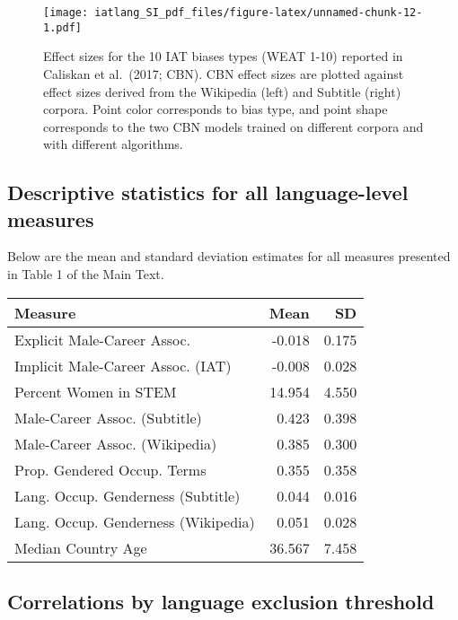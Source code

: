 \documentclass[]{article}
\begin{document}
\begin{figure}
\centering
\texttt{[image: iatlang\_SI\_pdf\_files/figure-latex/unnamed-chunk-12-1.pdf]}
\caption{Effect sizes for the 10 IAT biases types (WEAT 1-10) reported
in Caliskan et al.~(2017; CBN). CBN effect sizes are plotted against
effect sizes derived from the Wikipedia (left) and Subtitle (right)
corpora. Point color corresponds to bias type, and point shape
corresponds to the two CBN models trained on different corpora and with
different algorithms.}
\end{figure}

\hypertarget{descriptive-statistics-for-all-language-level-measures}{%
\subsection{Descriptive statistics for all language-level
measures}\label{descriptive-statistics-for-all-language-level-measures}}

Below are the mean and standard deviation estimates for all measures
presented in Table 1 of the Main Text.

\begin{table}[H]
\centering\begingroup\fontsize{9}{11}\selectfont

\begin{tabular}{l|r|r}
\hline
Measure & Mean & SD\\
\hline
Explicit Male-Career Assoc. & -0.018 & 0.175\\
\hline
Implicit Male-Career Assoc. (IAT) & -0.008 & 0.028\\
\hline
Percent Women in STEM & 14.954 & 4.550\\
\hline
Male-Career Assoc. (Subtitle) & 0.423 & 0.398\\
\hline
Male-Career Assoc. (Wikipedia) & 0.385 & 0.300\\
\hline
Prop. Gendered Occup. Terms & 0.355 & 0.358\\
\hline
Lang. Occup. Genderness (Subtitle) & 0.044 & 0.016\\
\hline
Lang. Occup. Genderness (Wikipedia) & 0.051 & 0.028\\
\hline
Median Country Age & 36.567 & 7.458\\
\hline
\end{tabular}
\endgroup{}
\end{table}

\hypertarget{correlations-by-language-exclusion-threshold}{%
\subsection{Correlations by language exclusion
threshold}\label{correlations-by-language-exclusion-threshold}}
\end{document}

